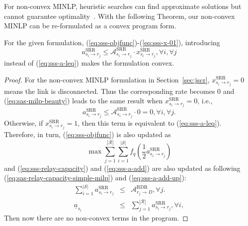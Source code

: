 \documentclass[conference]{IEEEtran}
\begin{document}
For non-convex MINLP, heuristic searches can find approximate solutions but cannot guarantee optimality~\cite{boydbook}.
With the following Theorem, our non-convex MINLP can be re-formulated as a convex program form.

\begin{thm}
For the given formulation, (\ref{eq:sss-objfunc})-(\ref{eq:sss-x-01}), introducing
\begin{equation}
a_{s_{i}\rightarrow r_{j}}^{\text{SRR}} \leq \mathcal{A}_{s_{i}\rightarrow r_{j}}^{\text{SRR}}\cdot x_{s_{i}\rightarrow r_{j}}^{\text{SRR}}, \forall i, \forall j\label{eq:sas-milp-beauty}
\end{equation}
instead of (\ref{eq:sss-a-leq}) makes the formulation convex.
\end{thm}
\begin{proof}
For the non-convex MINLP formulation in Section~\ref{sec:jscr}, $x_{s_{i}\rightarrow r_{j}}^{\text{SRR}}=0$ means the link is disconnected. Thus the corresponding rate becomes $0$ and (\ref{eq:sas-milp-beauty}) leads to the same result when $x_{s_{i}\rightarrow r_{j}}^{\text{SRR}}=0$, i.e.,
\begin{equation}
a_{s_{i}\rightarrow r_{j}}^{\text{SRR}} \leq \mathcal{A}_{s_{i}\rightarrow r_{j}}^{\text{SRR}}\cdot 0 = 0, \forall i, \forall j.
\end{equation}
Otherwise, if $x_{s_{i}\rightarrow r_{j}}^{\text{SRR}}=1$, then this term is equivalent to (\ref{eq:sss-a-leq}).
Therefore, in turn, (\ref{eq:sss-objfunc}) is also updated as
\begin{equation}
\max \sum_{j=1}^{|\mathcal{R}|}\sum_{i=1}^{|\mathcal{S}|}f_{q}\left(\frac{1}{2}a_{s_{i}\rightarrow r_{j}}^{\text{SRR}}\right)\label{eq:objfunc-sas-simple-milp}
\end{equation}
and (\ref{eq:sss-relay-capacity}) and (\ref{eq:sss-a-add}) are also updated as following (\ref{eq:sas-relay-capacity-simple-milp}) and (\ref{eq:sss-a-add-up}):
\begin{eqnarray}
\sum_{i=1}^{|\mathcal{S}|}a_{s_{i}\rightarrow r_{j}}^{\text{SRR}} &\leq& \mathcal{A}_{r_{j}\rightarrow D}^{\text{RDR}}, \forall j.\label{eq:sas-relay-capacity-simple-milp}\\
\underline{a}_{s_{i}} &\leq& \sum_{j=1}^{|\mathcal{R}|} a_{s_{i}\rightarrow r_{j}}^{\text{SRR}}, \forall i,\label{eq:sss-a-add-up}
\end{eqnarray}
Then now there are no non-convex terms in the program.
\end{proof}
\end{document}
